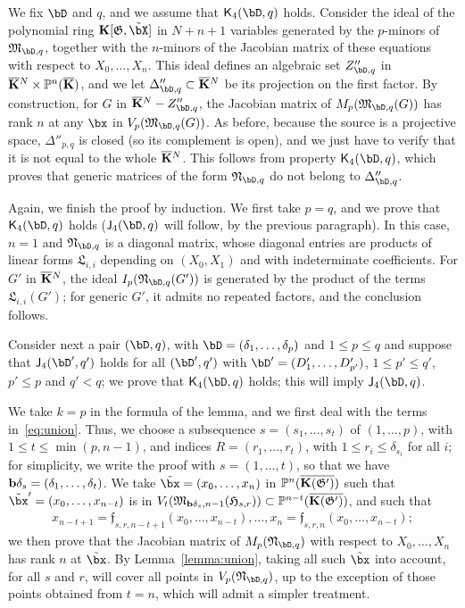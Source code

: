 \documentclass[12pt]{article}
\begin{document}
We fix $\bD$ and $q$, and we assume that $\assJ_4(\bD,q)$
holds. Consider the ideal of the polynomial ring
$\KK[\mathfrak{G},\tilde\bX]$ in $N+n+1$ variables generated by the
$p$-minors of $\mathfrak{M}_{\bD,q}$, together with the $n$-minors of
the Jacobian matrix of these equations with respect to
$X_0,\dots,X_n$. This ideal defines an algebraic set $Z''_{\bD,q}$ in
$\overline{\mathbf{K}}{}^N \times \mathbb{P}^n(\overline{\mathbf{K}})$, and we let $\Delta''_{\bD,q} \subset
\KKbar{}^N$ be its projection on the first factor. By construction,
for $G$ in $\KKbar{}^N-Z''_{\bD,q}$, the Jacobian matrix of
$M_p(\mathfrak{M}_{\bD,q}(G))$ has rank $n$ at any $\bx$ in
$V_p(\mathfrak{M}_{\bD,q}(G))$. As before, because the source is a
projective space, $\Delta''_{p,q}$ is closed (so its complement is
open), and we just have to verify that it is not equal to the whole
$\overline{\mathbf{K}}{}^N$. This follows from property $\assJ_4(\bD,q)$, which
proves that generic matrices of the form $\mathfrak{N}_{\bD,q}$ do not
belong to $\Delta''_{\bD,q}$.

Again, we finish the proof by induction. We first take $p=q$, and we
prove that $\assJ_4(\bD,q)$ holds ($\assI_4(\bD,q)$ will follow,
by the previous paragraph). In this case, $n=1$ and
$\mathfrak{N}_{\bD,q}$ is a diagonal matrix, whose diagonal entries
are products of linear forms $\mathfrak{L}_{i,i}$ depending on
$(X_0,X_1)$ and with indeterminate coefficients. For $G'$ in
$\overline{\mathbf{K}}{}^N$, the ideal $I_p(\mathfrak{N}_{\bD,q}(G'))$ is generated by
the product of the terms $\mathfrak{L}_{i,i}(G')$; for generic $G'$, it
admits no repeated factors, and the conclusion follows.

Consider next a pair $(\bD,q)$, with $\bD=(\delta_1,\dots,\delta_p)$ and $1 \le p
\le q$ and suppose that $\assI_4(\bD',q')$ holds for all $(\bD',q')$
with $\bD'=(D'_1,\dots,D'_{p'})$, $1 \le p' \le q'$, $p' \le p$ and $q' <
q$; we prove that $\assJ_4(\bD,q)$ holds; this will imply
 $\assI_4(\bD,q)$. 

We take $k=p$ in the formula of the lemma, and we first deal with the
terms in~\eqref{eq:union}.  Thus, we choose a subsequence
$s=(s_1,\dots,s_t)$ of $(1,\dots,p)$, with $1 \le t\le \min(p,n-1)$,
and indices $R=(r_1,\dots,r_t)$, with $ 1\le r_i \le \delta_{s_i}$ for all
$i$; for simplicity, we write the proof with $s=(1,\dots,t)$, so that
we have $\mathbf{b}\delta_s=(\delta_1,\dots,\delta_t)$. We take $\tilde\bx=(x_0,\dots,x_n)$
in $\mathbb{P}^n(\overline{\mathbf{K}(\mathfrak{G}')})$ such that $\tilde \bx'=(x_0,\dots,x_{n-t})$
is in $V_t(\mathfrak{M}_{\mathbf{b}\delta_s,n-1}(\mathfrak{H}_{s,r})) \subset
\mathbb{P}^{n-t}(\overline{\mathbf{K}(\mathfrak{G}')})$, and such that 
\begin{align}\label{eq:subsX}
  x_{n-t+1}=\mathfrak{f}_{s,r,n-t+1}(x_0,\dots,x_{n-t}),\dots,x_{n}=\mathfrak{f}_{s,r,n}(x_0,\dots,x_{n-t});
\end{align}
we then prove that the Jacobian matrix of $M_p(\mathfrak{N}_{\bD,q})$
with respect to $X_0,\dots,X_n$ has rank $n$ at $\tilde\bx$.  By
Lemma~\ref{lemma:union}, taking all such $\tilde\bx$ into account, for
all $s$ and $r$, will cover all points in $V_p(\mathfrak{N}_{\bD,q})$, up to the
exception of those points obtained from $t=n$, which will admit a
simpler treatment.
\end{document}
